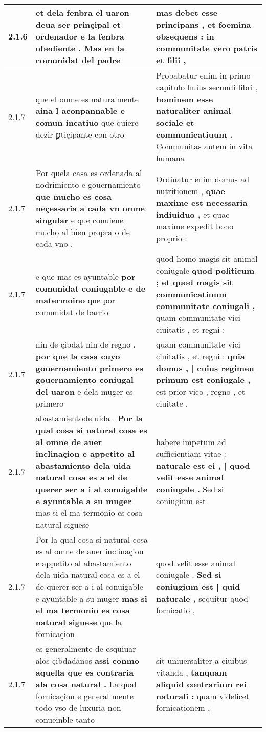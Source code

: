 \begin{tabular}{|p{1cm}|p{6.5cm}|p{6.5cm}|}
2.1.6 & et dela fenbra el uaron deua ser prinçipal et ordenador \textbf{ e la fenbra obediente . } Mas en la comunidat del padre & mas debet esse principans , \textbf{ et foemina obsequens : } in communitate vero patris et filii , \\\hline
2.1.7 & que el omne es naturalmente \textbf{ aina l aconpannable e comun incatiuo } que quiere dezir ꝑtiçipante con otro & Probabatur enim in primo capitulo huius secundi libri , \textbf{ hominem esse naturaliter animal sociale et communicatiuum . } Communitas autem in vita humana \\\hline
2.1.7 & Por quela casa es ordenada al nodrimiento e gouernamiento \textbf{ que mucho es cosa neçessaria a cada vn omne singular } e que conuiene mucho al bien propra o de cada vno . & Ordinatur enim domus ad nutritionem , \textbf{ quae maxime est necessaria indiuiduo , } et quae maxime expedit bono proprio : \\\hline
2.1.7 & e que mas es ayuntable \textbf{ por comunidat coniugable e de matermoino } que por comunidat de barrio & quod homo magis sit animal coniugale \textbf{ quod politicum ; et quod magis sit communicatiuum communitate coniugali , } quam communitate vici ciuitatis , et regni : \\\hline
2.1.7 & nin de çibdat nin de regno . \textbf{ por que la casa cuyo gouernamiento primero es gouernamiento coniugal del uaron } e dela muger es primero & quam communitate vici ciuitatis , et regni : \textbf{ quia domus , | cuius regimen primum est coniugale , } est prior vico , regno , et ciuitate . \\\hline
2.1.7 & abastamientode uida . \textbf{ Por la qual cosa si natural cosa es al omne de auer inclinaçion e appetito al abastamiento dela uida natural cosa es a el de querer ser a i al conuigable e ayuntable a su muger } mas si el ma termonio es cosa natural siguese & habere impetum ad sufficientiam vitae : \textbf{ naturale est ei , | quod velit esse animal coniugale . } Sed si coniugium est \\\hline
2.1.7 & Por la qual cosa si natural cosa es al omne de auer inclinaçion e appetito al abastamiento dela uida natural cosa es a el de querer ser a i al conuigable e ayuntable a su muger \textbf{ mas si el ma termonio es cosa natural siguese } que la fornicaçion & quod velit esse animal coniugale . \textbf{ Sed si coniugium est | quid naturale , } sequitur quod fornicatio , \\\hline
2.1.7 & es generalmente de esquiuar alos çibdadanos \textbf{ assi conmo aquella que es contraria ala cosa natural . } La qual fornicaçion e general mente todo vso de luxuria non conueinble tanto & sit uniuersaliter a ciuibus vitanda , \textbf{ tanquam aliquid contrarium rei naturali : } quam videlicet fornicationem , \\\hline

\end{tabular}
